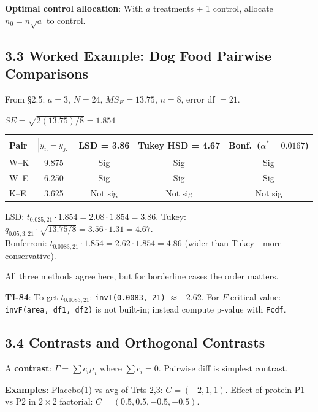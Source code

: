 \documentclass[9pt,letterpaper]{article}
\begin{document}
\textbf{Optimal control allocation}: With $a$ treatments + 1 control, allocate $n_0 = n\sqrt{a}$ to control.

\subsection{3.3 Worked Example: Dog Food Pairwise Comparisons}

From \S2.5: $a=3$, $N=24$, $MS_E=13.75$, $n=8$, error df $=21$.

$SE = \sqrt{2(13.75)/8} = 1.854$

\begin{center}\small
\begin{tabular}{@{}lcccc@{}}
\toprule
Pair & $|\bar{y}_{i.}-\bar{y}_{j.}|$ & LSD = 3.86 & Tukey HSD = 4.67 & Bonf.\ ($\alpha^*\!=\!0.0167$) \\
\midrule
W--K & 9.875 & Sig & Sig & Sig \\
W--E & 6.250 & Sig & Sig & Sig \\
K--E & 3.625 & Not sig & Not sig & Not sig \\
\bottomrule
\end{tabular}
\end{center}

LSD: $t_{0.025,21}\cdot 1.854 = 2.08\cdot 1.854 = 3.86$. \quad Tukey: $q_{0.05,3,21}\cdot\sqrt{13.75/8} = 3.56\cdot 1.31 = 4.67$.\\
Bonferroni: $t_{0.0083,21}\cdot 1.854 = 2.62\cdot 1.854 = 4.86$ (wider than Tukey---more conservative).

All three methods agree here, but for borderline cases the order matters.

\begin{calcbox}
\textbf{TI-84}: To get $t_{0.0083,21}$: \texttt{invT(0.0083, 21)} $\approx -2.62$. For $F$ critical value: \texttt{invF(area, df1, df2)} is not built-in; instead compute p-value with \texttt{Fcdf}.
\end{calcbox}

\subsection{3.4 Contrasts and Orthogonal Contrasts}

A \textbf{contrast}: $\Gamma = \sum c_i \mu_i$ where $\sum c_i = 0$. Pairwise diff is simplest contrast.

\textbf{Examples}: Placebo(1) vs avg of Trts 2,3: $C=(-2,1,1)$. Effect of protein P1 vs P2 in $2\times 2$ factorial: $C=(0.5, 0.5, -0.5, -0.5)$.
\end{document}
